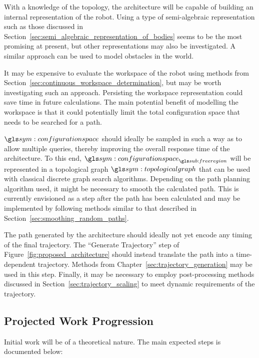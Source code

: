 	With a knowledge of the topology, the architecture will be capable of
	building an internal representation of the robot. Using a type of
	semi-algebraic representation such as those discussed in
	Section~\ref{sec:semi_algebraic_representation_of_bodies} seems to be the
	most promising at present, but other representations may also be
	investigated. A similar approach can be used to model obstacles in the
	world.

	It may be expensive to evaluate the workspace of the robot using methods
	from Section~\ref{sec:continuous_workspace_determination}, but may be worth
	investigating such an approach. Persisting the workspace representation
	could save time in future calculations. The main potential benefit of
	modelling the workspace is that it could potentially limit the total
	configuration space that needs to be searched for a path.

	$\configurationspace$ should ideally be sampled in such a way as to allow
	multiple queries, thereby improving the overall response time of the
	architecture. To this end, $\configurationspace_{\freeregion}$ will be
	represented in a topological graph $\topologicalgraph$ that can be used with
	classical discrete graph search algorithms. Depending on the path planning
	algorithm used, it might be necessary to smooth the calculated path. This is
	currently envisioned as a step after the path has been calculated and may be
	implemented by following methods similar to that described in
	Section~\ref{sec:smoothing_random_paths}.

	The path generated by the architecture should ideally not yet encode any
	timing of the final trajectory. The ``Generate Trajectory'' step of
	Figure~\ref{fig:proposed_architecture} should instead translate the path
	into a time-dependent trajectory. Methods from
	Chapter~\ref{sec:trajectory_generation} may be used in this step. Finally,
	it may be necessary to employ post-processing methods discussed in
	Section~\ref{sec:trajectory_scaling} to meet dynamic requirements of the
	trajectory.

	\subsection{Projected Work Progression}%
	\label{sec:projected_work_progression}

		Initial work will be of a theoretical nature. The main expected steps is
		documented below:

